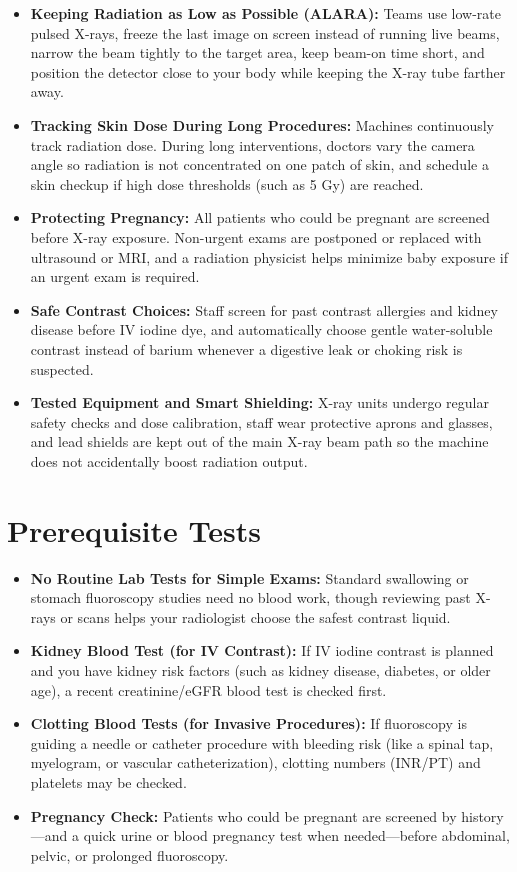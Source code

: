 \begin{itemize}
    \item \textbf{Keeping Radiation as Low as Possible (ALARA):} Teams use low-rate pulsed X-rays, freeze the last image on screen instead of running live beams, narrow the beam tightly to the target area, keep beam-on time short, and position the detector close to your body while keeping the X-ray tube farther away.
    \item \textbf{Tracking Skin Dose During Long Procedures:} Machines continuously track radiation dose. During long interventions, doctors vary the camera angle so radiation is not concentrated on one patch of skin, and schedule a skin checkup if high dose thresholds (such as 5 Gy) are reached.
    \item \textbf{Protecting Pregnancy:} All patients who could be pregnant are screened before X-ray exposure. Non-urgent exams are postponed or replaced with ultrasound or MRI, and a radiation physicist helps minimize baby exposure if an urgent exam is required.
    \item \textbf{Safe Contrast Choices:} Staff screen for past contrast allergies and kidney disease before IV iodine dye, and automatically choose gentle water-soluble contrast instead of barium whenever a digestive leak or choking risk is suspected.
    \item \textbf{Tested Equipment and Smart Shielding:} X-ray units undergo regular safety checks and dose calibration, staff wear protective aprons and glasses, and lead shields are kept out of the main X-ray beam path so the machine does not accidentally boost radiation output.
\end{itemize}

\section{Prerequisite Tests}

\begin{itemize}
    \item \textbf{No Routine Lab Tests for Simple Exams:} Standard swallowing or stomach fluoroscopy studies need no blood work, though reviewing past X-rays or scans helps your radiologist choose the safest contrast liquid.
    \item \textbf{Kidney Blood Test (for IV Contrast):} If IV iodine contrast is planned and you have kidney risk factors (such as kidney disease, diabetes, or older age), a recent creatinine/eGFR blood test is checked first.
    \item \textbf{Clotting Blood Tests (for Invasive Procedures):} If fluoroscopy is guiding a needle or catheter procedure with bleeding risk (like a spinal tap, myelogram, or vascular catheterization), clotting numbers (INR/PT) and platelets may be checked.
    \item \textbf{Pregnancy Check:} Patients who could be pregnant are screened by history---and a quick urine or blood pregnancy test when needed---before abdominal, pelvic, or prolonged fluoroscopy.
\end{itemize}

